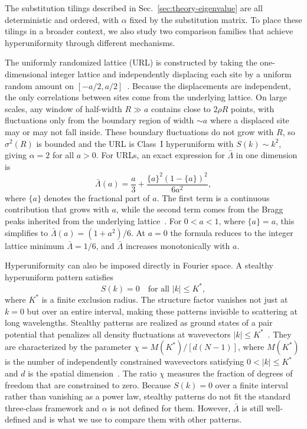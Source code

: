 \documentclass[11pt]{article}
\begin{document}
The substitution tilings described in Sec.~\ref{sec:theory-eigenvalue} are all deterministic and ordered, with $\alpha$ fixed by the substitution matrix. To place these tilings in a broader context, we also study two comparison families that achieve hyperuniformity through different mechanisms.

The uniformly randomized lattice (URL) is constructed by taking the one-dimensional integer lattice and independently displacing each site by a uniform random amount on $[-a/2, a/2]$~\cite{klatt2020perturbed}. Because the displacements are independent, the only correlations between sites come from the underlying lattice. On large scales, any window of half-width $R \gg a$ contains close to $2\rho R$ points, with fluctuations only from the boundary region of width $\sim a$ where a displaced site may or may not fall inside. These boundary fluctuations do not grow with $R$, so $\sigma^2(R)$ is bounded and the URL is Class~I hyperuniform with $S(k) \sim k^2$, giving $\alpha = 2$ for all $a > 0$. For URLs, an exact expression for $\bar\Lambda$ in one dimension~\cite{klatt2020perturbed} is
\begin{equation}
 \bar\Lambda(a) = \frac{a}{3} + \frac{\{a\}^2(1-\{a\})^2}{6a^2},
 \label{eq:url-lambda}
\end{equation}
where $\{a\}$ denotes the fractional part of $a$. The first term is a continuous contribution that grows with $a$, while the second term comes from the Bragg peaks inherited from the underlying lattice~\cite{klatt2020perturbed}. For $0 < a < 1$, where $\{a\} = a$, this simplifies to $\bar\Lambda(a) = (1+a^2)/6$. At $a = 0$ the formula reduces to the integer lattice minimum $\bar\Lambda = 1/6$, and $\bar\Lambda$ increases monotonically with $a$.

Hyperuniformity can also be imposed directly in Fourier space. A stealthy hyperuniform pattern satisfies~\cite{torquato2015ensemble}
\begin{equation}
 S(k) = 0 \quad \text{for all }|k| \leq K^*,
 \label{eq:stealthy-condition}
\end{equation}
where $K^*$ is a finite exclusion radius. The structure factor vanishes not just at $k = 0$ but over an entire interval, making these patterns invisible to scattering at long wavelengths. Stealthy patterns are realized as ground states of a pair potential that penalizes all density fluctuations at wavevectors $|k| \leq K^*$~\cite{torquato2015ensemble}. They are characterized by the parameter $\chi = M(K^*)/[d(N-1)]$, where $M(K^*)$ is the number of independently constrained wavevectors satisfying $0 < |k| \leq K^*$ and $d$ is the spatial dimension~\cite{torquato2015ensemble}. The ratio $\chi$ measures the fraction of degrees of freedom that are constrained to zero. Because $S(k) = 0$ over a finite interval rather than vanishing as a power law, stealthy patterns do not fit the standard three-class framework and $\alpha$ is not defined for them. However, $\bar\Lambda$ is still well-defined and is what we use to compare them with other patterns.
\end{document}
